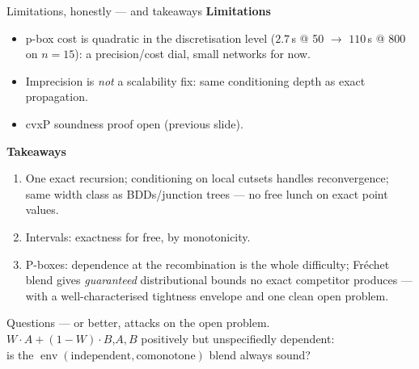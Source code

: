 \documentclass[aspectratio=169,11pt]{beamer}
\begin{document}
\begin{frame}{Limitations, honestly --- and takeaways}
\textbf{Limitations}
\begin{itemize}
\item p-box cost is quadratic in the discretisation level ($2.7\,$s @ 50 $\to$ $110\,$s @ 800 on
  $n{=}15$): a precision/cost dial, small networks for now.
\item Imprecision is \emph{not} a scalability fix: same conditioning depth as exact propagation.
\item cvxP soundness proof open (previous slide).
\end{itemize}
\medskip
\textbf{Takeaways}
\begin{enumerate}
\item One exact recursion; conditioning on local cutsets handles reconvergence; same width class as
  BDDs/junction trees --- no free lunch on exact point values.
\item Intervals: exactness for free, by monotonicity.
\item P-boxes: dependence at the recombination is the whole difficulty; Fr\'echet blend gives
  \emph{guaranteed} distributional bounds no exact competitor produces --- with a well-characterised
  tightness envelope and one clean open problem.
\end{enumerate}
\end{frame}

\begin{frame}{}
\centering\Large
Questions --- or better, attacks on the open problem.\\[2em]
\normalsize
$W\!\cdot\!A+(1{-}W)\!\cdot\!B$,\quad $A,B$ positively but unspecifiedly dependent:\\
is the $\operatorname{env}(\text{independent},\text{comonotone})$ blend always sound?
\end{frame}
\end{document}
